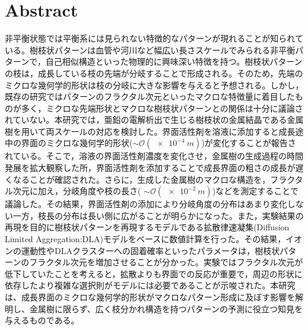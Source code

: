 \documentclass[autodetect-engine,dvi=dvipdfmx,a4paper,ja=standard,oneside,openany,11pt,draft]{bxjsarticle}
\begin{document}
\chapter{Abstract}
非平衡状態では平衡系には見られない特徴的なパターンが現れることが知られている。樹枝状パターンは血管や河川など幅広い長さスケールでみられる非平衡パターンで，自己相似構造といった物理的に興味深い特徴を持つ。樹枝状パターンの枝は，成長している枝の先端が分岐することで形成される。そのため，先端のミクロな幾何学的形状は枝の分岐に大きな影響を与えると予想される。しかし，既存の研究ではパターンのフラクタル次元といったマクロな特徴量に着目したものが多く，ミクロな先端形状とマクロな樹枝状パターンとの関係は十分に議論されていない。本研究では，亜鉛の電解析出で生じる樹枝状の金属結晶である金属樹を用いて両スケールの対応を検討した。界面活性剤を溶液に添加すると成長途中の界面のミクロな幾何学的形状($\sim\mathcal{O}(\SI{e-4}{m})$)が変化することが報告されている。そこで，溶液の界面活性剤濃度を変化させ，金属樹の生成過程の時間発展を拡大観察した所，界面活性剤を添加することで成長界面の粗さの成長が遅くなることが確認された。さらに，生成した金属樹のマクロな構造を，フラクタル次元に加え，分岐角度や枝の長さ( $\sim\mathcal{O}(\SI{e-2}{m})$)などを測定することで議論した。その結果，界面活性剤の添加により分岐角度の分布はあまり変化しない一方，枝長の分布は長い側に広がることが明らかになった。また，実験結果の再現を目的に樹枝状パターンを再現するモデルである拡散律速凝集(Diffusion Limited Aggregation:DLA)モデルをベースに数値計算を行った。その結果，イオンの運動性やDLAクラスターへの固着確率といったパラメータは，樹枝状パターンのフラクタル次元を増加させることが分かった。実験ではフラクタル次元が低下していたことを考えると，拡散よりも界面での反応が重要で，周辺の形状に依存したより複雑な選択則がモデルには必要であることが示唆された。本研究は、成長界面のミクロな幾何学的形状がマクロなパターン形成に及ぼす影響を解明し、金属樹に限らず、広く枝分かれ構造を持つパターンの予測に役立つ知見を与えるものである。

\ifdraft{
  
  
}{}
\end{document}
